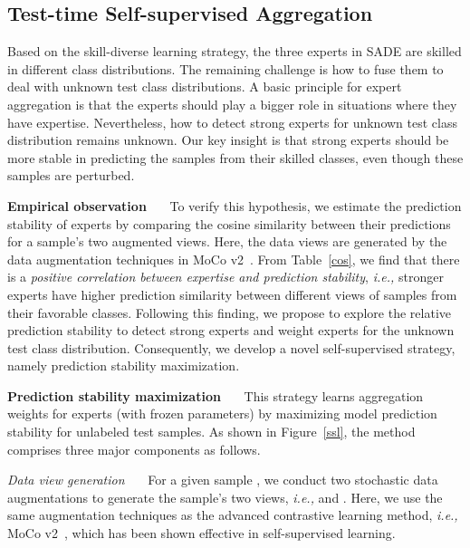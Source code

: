 \documentclass{article}
\def\ie{\emph{i.e.}} \def\Ie{\emph{I.e.}}
\def\ie{\emph{i.e., }}
\begin{document}
\subsection{Test-time Self-supervised Aggregation}
\label{Test_Time}
Based on the skill-diverse learning strategy, the  three experts in SADE are skilled   in different class distributions.  The remaining challenge is how to fuse them to deal with unknown test class distributions. 
A basic principle for expert aggregation is that the experts should play a bigger role in situations where they have expertise.  
Nevertheless, how to detect strong experts for  unknown  test class distribution remains unknown.  
Our key insight is that strong experts should be  more stable in predicting the samples from their skilled classes,  even though these samples are perturbed. 

\vspace{0.05in}
\textbf{Empirical observation}~~~ To verify this hypothesis, we estimate the prediction stability of  experts by comparing the cosine similarity between their predictions for a  sample's two augmented views. Here, the data views are generated by  the   data augmentation techniques in MoCo v2~\cite{chen2020improved}. From Table~\ref{cos}, we find  that there is a  \emph{positive correlation between  expertise and prediction stability}, \ie stronger experts have higher prediction similarity between  different views of samples from their favorable classes.  
Following this finding, we propose to explore the relative prediction stability to detect strong experts and weight   experts for the  unknown  test class  distribution. Consequently, we develop a novel self-supervised  strategy, namely prediction stability maximization.

\vspace{0.05in} 
\textbf{Prediction stability maximization}~~~ This strategy learns aggregation weights for  experts (with frozen parameters) by maximizing model  prediction stability  for unlabeled test samples.  As shown in Figure~\ref{ssl}, the method comprises  three  major components as follows. 
 

\emph{Data view generation}~~~ For a given sample , we conduct two stochastic data augmentations to generate the sample's two   views, \ie  and . 
Here,  we use the same   augmentation techniques  as the advanced contrastive learning method, \ie MoCo v2~\cite{chen2020improved}, which has been shown   effective in self-supervised learning.  
\end{document}
